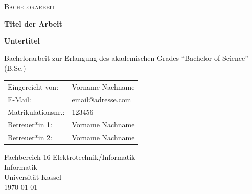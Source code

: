\begin{titlepage}

\begin{center}
{\scshape \Large Bachelorarbeit} %

\vfill
{\bfseries \Huge Titel der Arbeit}

\vspace{0.5cm}
{\bfseries \LARGE Untertitel}

\vfill
{\large Bachelorarbeit zur Erlangung des akademischen Grades %
\enquote{Bachelor of Science} (B.Sc.)} %
  
\vfill
\setlength{\tabcolsep}{0.7cm}
\begin{tabular}{l l}
    Eingereicht von: & Vorname Nachname\\ %
    E-Mail: & \href{mailto:email@adresse.com}{email@adresse.com}\\
    Matrikulationsnr.: & 123456\\\noalign{\bigskip} %
    Betreuer*in 1: & Vorname Nachname\\ %
    Betreuer*in 2: & Vorname Nachname\\
\end{tabular}

\vfill
Fachbereich 16 Elektrotechnik/Informatik\\ %
Informatik\\ %
Universität Kassel\\

\vfill
\today %

\end{center}

\end{titlepage}